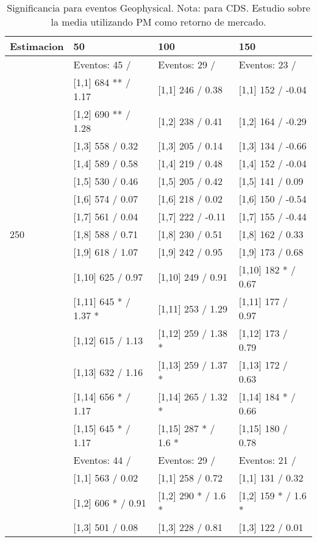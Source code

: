 \begin{table}

\caption{Significancia para eventos Geophysical. Nota: para CDS. Estudio sobre la media utilizando PM como retorno de mercado.}
\centering
\begin{tabular}[t]{llll}
\toprule
Estimacion & 50 & 100 & 150\\
\midrule
 & Eventos:  45 / & Eventos:  29 / & Eventos:  23 /\\
 & {}[1,1] 684 ** / 1.17 & {}[1,1] 246  / 0.38 & {}[1,1] 152  / -0.04\\
 & {}[1,2] 690 ** / 1.28 & {}[1,2] 238  / 0.41 & {}[1,2] 164  / -0.29\\
 & {}[1,3] 558  / 0.32 & {}[1,3] 205  / 0.14 & {}[1,3] 134  / -0.66\\
 & {}[1,4] 589  / 0.58 & {}[1,4] 219  / 0.48 & {}[1,4] 152  / -0.04\\
\addlinespace
 & {}[1,5] 530  / 0.46 & {}[1,5] 205  / 0.42 & {}[1,5] 141  / 0.09\\
 & {}[1,6] 574  / 0.07 & {}[1,6] 218  / 0.02 & {}[1,6] 150  / -0.54\\
 & {}[1,7] 561  / 0.04 & {}[1,7] 222  / -0.11 & {}[1,7] 155  / -0.44\\
250 & {}[1,8] 588  / 0.71 & {}[1,8] 230  / 0.51 & {}[1,8] 162  / 0.33\\
 & {}[1,9] 618  / 1.07 & {}[1,9] 242  / 0.95 & {}[1,9] 173  / 0.68\\
\addlinespace
 & {}[1,10] 625  / 0.97 & {}[1,10] 249  / 0.91 & {}[1,10] 182 * / 0.67\\
 & {}[1,11] 645 * / 1.37 * & {}[1,11] 253  / 1.29 & {}[1,11] 177  / 0.97\\
 & {}[1,12] 615  / 1.13 & {}[1,12] 259  / 1.38 * & {}[1,12] 173  / 0.79\\
 & {}[1,13] 632  / 1.16 & {}[1,13] 259  / 1.37 * & {}[1,13] 172  / 0.63\\
 & {}[1,14] 656 * / 1.17 & {}[1,14] 265  / 1.32 * & {}[1,14] 184 * / 0.66\\
\addlinespace
 & {}[1,15] 645 * / 1.17 & {}[1,15] 287 * / 1.6 * & {}[1,15] 180  / 0.78\\
 & Eventos:  44 / & Eventos:  29 / & Eventos:  21 /\\
 & {}[1,1] 563  / 0.02 & {}[1,1] 258  / 0.72 & {}[1,1] 131  / 0.32\\
 & {}[1,2] 606 * / 0.91 & {}[1,2] 290 * / 1.6 * & {}[1,2] 159 * / 1.6 *\\
 & {}[1,3] 501  / 0.08 & {}[1,3] 228  / 0.81 & {}[1,3] 122  / 0.01\\

\end{tabular}
\end{table}
